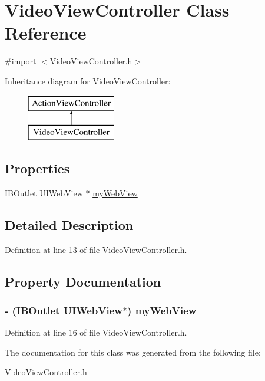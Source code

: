 \hypertarget{interface_video_view_controller}{
\section{VideoViewController Class Reference}
\label{interface_video_view_controller}
}


{\ttfamily \#import $<$VideoViewController.h$>$}

Inheritance diagram for VideoViewController:\begin{figure}[H]
\begin{center}
\leavevmode
\includegraphics[height=2.000000cm]{interface_video_view_controller}
\end{center}
\end{figure}
\subsection*{Properties}
\begin{DoxyCompactItemize}
\item 
IBOutlet UIWebView $\ast$ \hyperlink{interface_video_view_controller_a9527d1e82d0094024e571c7e2e6ef741}{myWebView}
\end{DoxyCompactItemize}


\subsection{Detailed Description}


Definition at line 13 of file VideoViewController.h.



\subsection{Property Documentation}
\hypertarget{interface_video_view_controller_a9527d1e82d0094024e571c7e2e6ef741}{
\subsubsection[{myWebView}]{\setlength{\rightskip}{0pt plus 5cm}-\/ (IBOutlet UIWebView$\ast$) myWebView}}
\label{interface_video_view_controller_a9527d1e82d0094024e571c7e2e6ef741}


Definition at line 16 of file VideoViewController.h.



The documentation for this class was generated from the following file:\begin{DoxyCompactItemize}
\item 
\hyperlink{_video_view_controller_8h}{VideoViewController.h}\end{DoxyCompactItemize}
